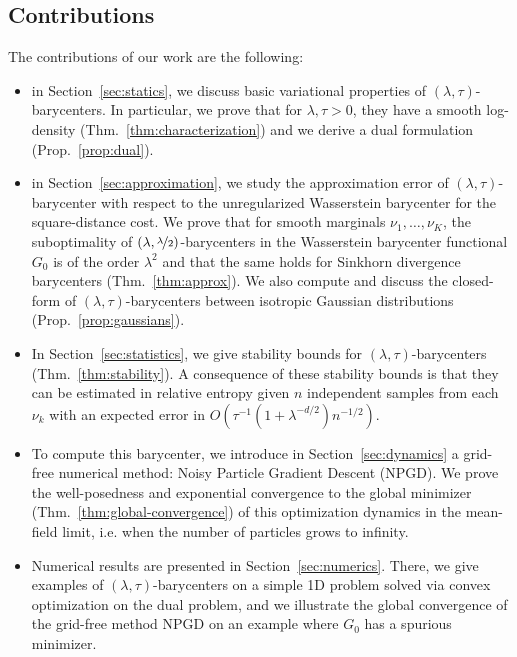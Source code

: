 \documentclass[11pt]{article}
\begin{document}
\subsection{Contributions}
The contributions of our work are the following:
\begin{itemize}
\item in Section~\ref{sec:statics}, we discuss basic variational properties of $(\lambda,\tau)$-barycenters. In particular, we prove that for $\lambda,\tau>0$, they have a smooth log-density (Thm.~\ref{thm:characterization}) and we derive a dual formulation (Prop.~\ref{prop:dual}).
\item in Section~\ref{sec:approximation}, we study the approximation error of $(\lambda,\tau)$-barycenter with respect to the unregularized Wasserstein barycenter for the square-distance cost. We prove that for smooth marginals $\nu_1,\dots,\nu_K$, the suboptimality of $(\lambda,\nicefrac{\lambda}{2})$-barycenters in the Wasserstein barycenter functional $G_0$ is of the order $\lambda^2$ and that the same holds for Sinkhorn divergence barycenters (Thm.~\ref{thm:approx}). We also compute and discuss the closed-form of $(\lambda,\tau)$-barycenters between isotropic Gaussian distributions (Prop.~\ref{prop:gaussians}). 

\item In Section~\ref{sec:statistics}, we give stability bounds for $(\lambda,\tau)$-barycenters (Thm.~\ref{thm:stability}). A consequence of these stability bounds is that they can be estimated in relative entropy given $n$ independent samples from each $\nu_k$ with an expected error in $O(\tau^{-1}(1+\lambda^{-d/2})n^{-1/2})$.

\item To compute this barycenter, we introduce in Section~\ref{sec:dynamics} a grid-free numerical method: Noisy Particle Gradient Descent (NPGD). We prove the well-posedness and exponential convergence to the global minimizer (Thm.~\ref{thm:global-convergence}) of this optimization dynamics in the mean-field limit, i.e. when the number of particles grows to infinity. 

\item Numerical results are presented in Section~\ref{sec:numerics}. There, we give examples of $(\lambda,\tau)$-barycenters on a simple 1D problem solved via convex optimization on the dual problem, and we illustrate the global convergence of the grid-free method NPGD on an example where $G_0$ has a spurious minimizer. 

\end{itemize}
\end{document}
